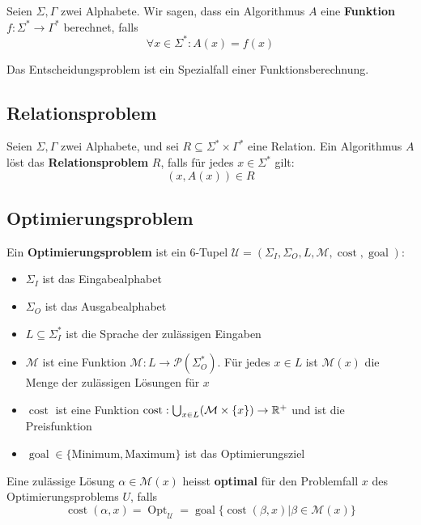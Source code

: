 \begin{definition}
Seien $\Sigma, \Gamma$ zwei Alphabete. Wir sagen, dass ein Algorithmus $A$ eine \textbf{Funktion $f: \Sigma^* \to \Gamma^*$} berechnet, falls
\[
\forall x \in \Sigma^*: A(x) = f(x)
\]
\end{definition}

Das Entscheidungsproblem ist ein Spezialfall einer Funktionsberechnung.

\subsection{Relationsproblem}
\begin{definition}
Seien $\Sigma, \Gamma$ zwei Alphabete, und sei $R \subseteq \Sigma^* \times \Gamma^*$ eine Relation. Ein Algorithmus $A$ löst das \textbf{Relationsproblem} $R$, falls für jedes $x \in \Sigma^*$ gilt:
\[
(x, A(x)) \in R
\]
\end{definition}

\subsection{Optimierungsproblem}
\begin{definition}
Ein \textbf{Optimierungsproblem} ist ein 6-Tupel $\mathcal{U} = (\Sigma_I, \Sigma_O, L, \mathcal{M}, \operatorname{cost}, \operatorname{goal})$:
\begin{itemize}
  \item $\Sigma_I$ ist das Eingabealphabet
  \item $\Sigma_O$ ist das Ausgabealphabet
  \item $L \subseteq \Sigma_I^*$ ist die Sprache der zulässigen Eingaben
  \item $\mathcal{M}$ ist eine Funktion $\mathcal{M}: L \to \mathcal{P}(\Sigma_O^*)$. Für jedes $x \in L$ ist $\mathcal{M}(x)$ die Menge der zulässigen Lösungen für $x$
  \item $\operatorname{cost}$ ist eine Funktion $\operatorname{cost}: \bigcup_{x \in L}(\mathcal{M} \times \{x\}) \to \mathbb{R}^+$ und ist die Preisfunktion
  \item $\operatorname{goal} \in \{\text{Minimum}, \text{Maximum}\}$ ist das Optimierungsziel
\end{itemize}

Eine zulässige Lösung $\alpha \in \mathcal{M}(x)$ heisst \textbf{optimal} für den Problemfall $x$ des Optimierungsproblems $U$, falls
\[
\operatorname{cost}(\alpha, x) = \operatorname{Opt}_\mathcal{U} = \operatorname{goal}\{\operatorname{cost}(\beta, x) | \beta \in \mathcal{M}(x)\}
\]\\
\end{definition}

